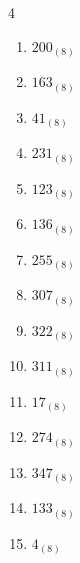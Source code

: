 \begin{multicols}{4}
\begin{enumerate}
        \phantom{$=55$}

  \item $200_{(8)}$

        \phantom{$=128$}

  \item $163_{(8)}$

        \phantom{$=115$}

  \item $41_{(8)}$

        \phantom{$=33$}

  \item $231_{(8)}$

        \phantom{$=153$}

  \item $123_{(8)}$

        \phantom{$=83$}

  \item $136_{(8)}$

        \phantom{$=94$}

  \item $255_{(8)}$

        \phantom{$=173$}

  \item $307_{(8)}$

        \phantom{$=199$}

  \item $322_{(8)}$

        \phantom{$=210$}

  \item $311_{(8)}$

        \phantom{$=201$}

  \item $17_{(8)}$

        \phantom{$=15$}

  \item $274_{(8)}$

        \phantom{$=188$}

  \item $347_{(8)}$

        \phantom{$=231$}

  \item $133_{(8)}$

        \phantom{$=91$}

\columnbreak %

  \item $4_{(8)}$

        \phantom{$=4$}


\end{enumerate}
\end{multicols}

